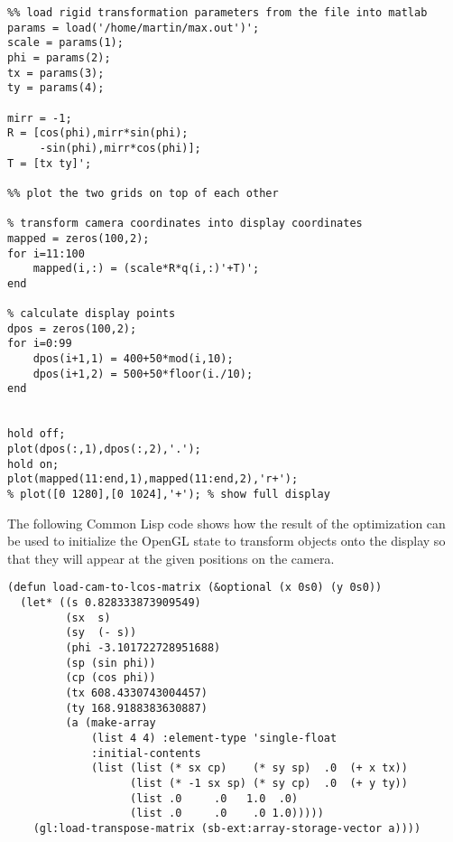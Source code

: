 {\begin{verbatim}
%% load rigid transformation parameters from the file into matlab
params = load('/home/martin/max.out')';
scale = params(1);
phi = params(2);
tx = params(3);
ty = params(4);

mirr = -1;
R = [cos(phi),mirr*sin(phi);
     -sin(phi),mirr*cos(phi)];
T = [tx ty]';

%% plot the two grids on top of each other

% transform camera coordinates into display coordinates
mapped = zeros(100,2);
for i=11:100
    mapped(i,:) = (scale*R*q(i,:)'+T)';
end

% calculate display points
dpos = zeros(100,2);
for i=0:99
    dpos(i+1,1) = 400+50*mod(i,10);
    dpos(i+1,2) = 500+50*floor(i./10);
end


hold off;
plot(dpos(:,1),dpos(:,2),'.');
hold on;
plot(mapped(11:end,1),mapped(11:end,2),'r+');
% plot([0 1280],[0 1024],'+'); % show full display
\end{verbatim}}



The following Common Lisp code shows how the result of the
optimization can be used to initialize the OpenGL state to transform
objects onto the display so that they will appear at the given
positions on the camera.
{\small
\begin{verbatim}
(defun load-cam-to-lcos-matrix (&optional (x 0s0) (y 0s0))
  (let* ((s 0.828333873909549)
         (sx  s)
         (sy  (- s))
         (phi -3.101722728951688)
         (sp (sin phi))
         (cp (cos phi))
         (tx 608.4330743004457)
         (ty 168.9188383630887)
         (a (make-array
             (list 4 4) :element-type 'single-float
             :initial-contents
             (list (list (* sx cp)    (* sy sp)  .0  (+ x tx))
                   (list (* -1 sx sp) (* sy cp)  .0  (+ y ty))
                   (list .0     .0   1.0  .0)
                   (list .0     .0    .0 1.0)))))
    (gl:load-transpose-matrix (sb-ext:array-storage-vector a))))    
\end{verbatim}}

